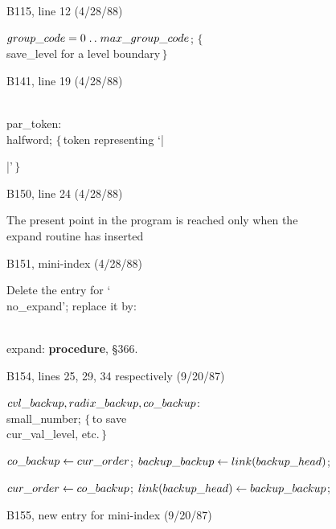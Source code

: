 \bugonpage B115, line 12 (4/28/88)

\ninepoint\noindent\hskip10pt
$\\{group\_code}=0\to\\{max\_group\_code}$;\quad
 $\{\,$\\{save\_level} for a level boundary$\,\}$

\bugonpage B141, line 19 (4/28/88)

\ninepoint\noindent
\\{par\_token}: \\{halfword};\quad
 $\{\,$token representing `|\par|'$\,\}$

\bugonpage B150, line 24 (4/28/88)

\tenpoint{}%
The present point in the program is reached only when the \\{expand}
routine has inserted\cutpar

\bugonpage B151, mini-index (4/28/88)

\eightpoint\noindent
Delete the entry for `\\{no\_expand}'; replace it by:

\indent\\{expand}: {\bf procedure}, \S366.

\bugonpage B154, lines 25, 29, 34 respectively (9/20/87)

\ninepoint\noindent\hskip20pt
$\\{cvl\_backup},\\{radix\_backup},\\{co\_backup}$: \\{small\_number};\quad
 $\{\,$to save \\{cur\_val\_level}, etc.$\,\}$\par\noindent\hskip10pt
$\\{co\_backup}\gets\\{cur\_order}$;
 $\\{backup\_backup}\gets\\{link}(\\{backup\_head})$;\par\noindent\hskip10pt
$\\{cur\_order}\gets\\{co\_backup}$;
 $\\{link}(\\{backup\_head})\gets\\{backup\_backup}$;

\bugonpage B155, new entry for mini-index (9/20/87)


